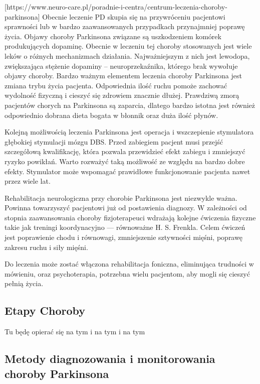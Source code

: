 [https://www.neuro-care.pl/poradnie-i-centra/centrum-leczenia-choroby-parkinsona]
Obecnie leczenie PD skupia się na przywróceniu pacjentowi sprawności lub w bardzo zaawansowanych przypadkach przynajmniej
poprawę życia. Objawy choroby Parkinsona związane są uszkodzeniem komórek produkujących dopaminę. Obecnie w leczeniu
tej choroby stosowanych jest wiele leków o różnych mechanizmach działania. Najważniejszym z nich jest lewodopa,
zwiększająca stężenie dopaminy – neuroprzekaźnika, którego brak wywołuje objawy choroby. Bardzo ważnym elementem
leczenia choroby Parkinsona jest zmiana trybu życia pacjenta. Odpowiednia ilość ruchu pomoże zachować wydolność
fizyczną i cieszyć się zdrowiem znacznie dłużej. Prawdziwą zmorą pacjentów chorych na Parkinsona są zaparcia,
dlatego bardzo istotna jest również odpowiednio dobrana dieta bogata w błonnik oraz duża ilość płynów.

Kolejną możliwością leczenia Parkinsona jest operacja i wszczepienie stymulatora głębokiej stymulacji mózgu DBS.
Przed zabiegiem pacjent musi przejść szczegółową kwalifikację, która pozwala przewidzieć efekt zabiegu i zmniejszyć
ryzyko powikłań. Warto rozważyć taką możliwość ze względu na bardzo dobre efekty. Stymulator może wspomagać prawidłowe
funkcjonowanie pacjenta nawet przez wiele lat.

Rehabilitacja neurologiczna przy chorobie Parkinsona jest niezwykle ważna. Powinna towarzyszyć pacjentowi już od
postawienia diagnozy. W zależności od stopnia zaawansowania choroby fizjoterapeuci wdrażają kolejne ćwiczenia fizyczne
takie jak treningi koordynacyjno — równoważne H. S. Frenkla. Celem ćwiczeń jest poprawienie chodu i równowagi,
zmniejszenie sztywności mięśni, poprawę zakresu ruchu i siły mięśni.


Do leczenia może zostać włączona rehabilitacja foniczna, eliminująca trudności w mówieniu, oraz psychoterapia, potrzebna wielu pacjentom, aby mogli się cieszyć pełnią życia.


\subsection{Etapy Choroby}
\label{subsec:etapypd}

Tu będę opierać się na tym\cite{Szurek_2018} i na tym\cite{Wieczorek_2013} i na tym\cite{Kuryłowicz_2019}

\subsection{Metody diagnozowania i monitorowania choroby Parkinsona}
\label{subsec:diagnostyka}


